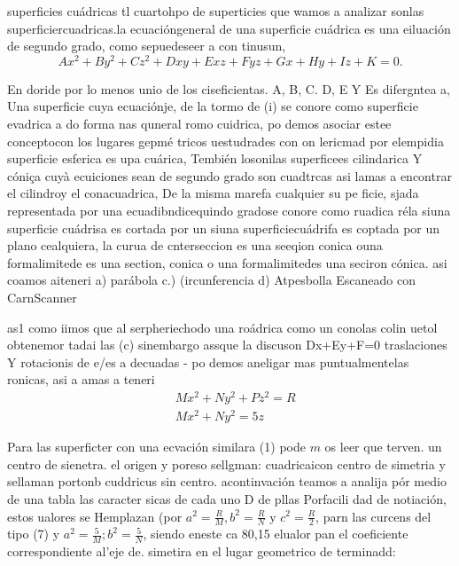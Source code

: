

superficies cuádricas
tl cuartohpo de superticies que wamos a analizar sonlas superficiercuadricas.la ecuacióngeneral de una superficie cuádrica es una eiluación de segundo grado, como sepuedeseer a con tinusun,
$$
A x^2+B y^2+C z^2+D x y+E x z+F y z+G x+H y+I z+K=0 .
$$

En doride por lo menos unio de los ciseficientas. A, B, C. D, E Y Es difergntea a, Una superficie cuya ecuaciónje, de la tormo de (i) se conore como superficie evadrica a do forma nas quneral romo cuidrica, po demos asociar estee conceptocon los lugares gepmé tricos uestudrades con on lericmad por elempidia superficie esferica es upa cuárica, Tembién losonilas superficees cilindarica Y cóniça cuyà ecuiciones sean de segundo grado son cuadtrcas asi lamas a encontrar el cilindroy el conacuadrica, De la misma marefa cualquier su pe ficie, sjada representada por una ecuadibndicequindo gradose conore
como ruadica réla
siuna superficie cuádrisa es cortada por un
siuna superficiecuádrifa es coptada por un
plano cealquiera, la curua de cnterseccion
es una seeqion conica ouna formalimitede es una section, conica o una formalimitedes una seciron cónica. asi coamos aiteneri
a) parábola c.) (ircunferencia
d) Atpesbolla
Escaneado con CarnScanner




as1 como iimos que al serpheriechodo una roádrica como un conolas colin uetol obtenemor tadai las
(c)
sinembargo assque la discuson Dx+Ey+F=0 traslaciones Y rotacionis de e/es a decuadas
- po demos aneligar mas puntualmentelas ronicas, asi a amas a teneri
$$
\begin{aligned}
	& M x^2+N y^2+P z^2=R \\
	& M x^2+N y^2=5 z
\end{aligned}
$$

Para las superficter con una ecvación similara (1) pode $m$ os leer que terven. un centro de sienetra. el origen y poreso sellgman: cuadricaicon centro de simetria y sellaman portonb cuddricus sin centro.
acontinvación teamos a analija pór medio de una tabla las caracter sicas de cada uno
D
de pllas
Porfacili dad de notiación, estos ualores se Hemplazan (por $a^2=\frac{R}{M}, b^2=\frac{R}{N}$ y $c^2=\frac{R}{2}$, parn las curcens del tipo (7) y $a^2=\frac{5}{M} ; b^2=\frac{5}{N}$, siendo eneste ca 80,15 elualor pan el coeficiente correspondiente al'eje de. simetira en el lugar geometrico de terminadd:


